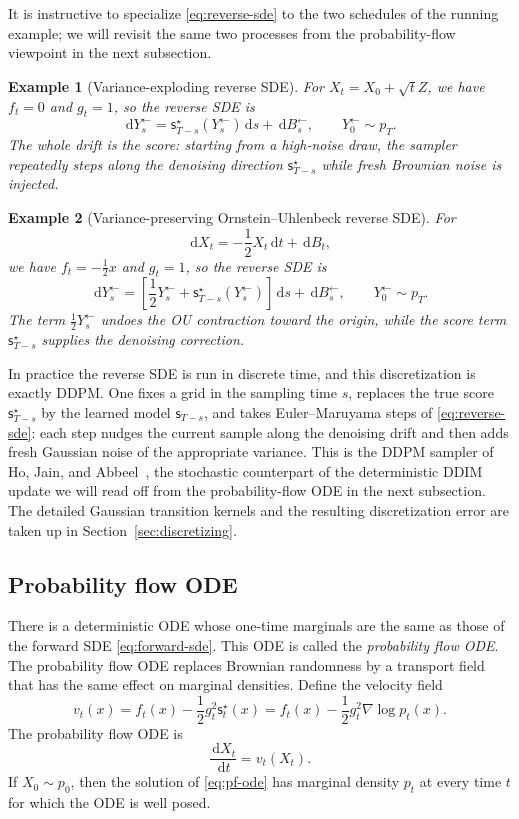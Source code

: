 \documentclass[10pt,a4paper]{amsart}
\numberwithin{equation}{section}
\newtheorem*{example}{Example}
\newcommand{\dd}{\,\mathrm{d}}
\newcommand{\sstar}{\mathsf{s}^{\star}}
\newcommand{\score}{\mathsf{s}}
\begin{document}
It is instructive to specialize \eqref{eq:reverse-sde} to the two schedules of
the running example; we will revisit the same two processes from the
probability-flow viewpoint in the next subsection.

\begin{example}[Variance-exploding reverse SDE]
For $X_t=X_0+\sqrt t Z$, we have $f_t=0$ and $g_t=1$, so the reverse SDE is
\[
    \dd Y^{\leftarrow}_s=\sstar_{T-s}(Y^{\leftarrow}_s)\dd s+\dd B^{\leftarrow}_s,
    \qquad Y^{\leftarrow}_0\sim p_T.
\]
The whole drift is the score: starting from a high-noise draw, the sampler
repeatedly steps along the denoising direction $\sstar_{T-s}$ while fresh
Brownian noise is injected.
\end{example}

\begin{example}[Variance-preserving Ornstein--Uhlenbeck reverse SDE]
For
\[
    \dd X_t=-\frac12X_t\dd t+\dd B_t,
\]
we have $f_t=-\frac12x$ and $g_t=1$, so the reverse SDE is
\[
    \dd Y^{\leftarrow}_s=\left[\frac12 Y^{\leftarrow}_s+\sstar_{T-s}(Y^{\leftarrow}_s)\right]\dd s+\dd B^{\leftarrow}_s,
    \qquad Y^{\leftarrow}_0\sim p_T.
\]
The term $\frac12 Y^{\leftarrow}_s$ undoes the OU contraction toward the origin, while the
score term $\sstar_{T-s}$ supplies the denoising correction.
\end{example}

In practice the reverse SDE is run in discrete time, and this discretization is
exactly DDPM\@.  One fixes a grid in the sampling time $s$, replaces the true
score $\sstar_{T-s}$ by the learned model $\score_{T-s}$, and takes
Euler--Maruyama steps of \eqref{eq:reverse-sde}: each step nudges the current
sample along the denoising drift and then adds fresh Gaussian noise of the
appropriate variance.  This is the DDPM sampler of Ho, Jain, and
Abbeel~\cite{ho2020ddpm}, the stochastic counterpart of the deterministic DDIM
update we will read off from the probability-flow ODE in the next subsection.
The detailed Gaussian transition kernels and the resulting discretization error
are taken up in Section~\ref{sec:discretizing}.

\subsection{Probability flow ODE}

There is a deterministic ODE whose one-time marginals are the same as those of
the forward SDE \eqref{eq:forward-sde}.  This ODE is called the
\emph{probability flow ODE}. The probability flow ODE replaces
Brownian randomness by a transport field that has the same effect on
marginal densities. Define the velocity field
\begin{equation}\label{eq:pf-velocity}
    v_t(x)
    =
    f_t(x)-\frac12 g_t^2\sstar_t(x)
    =
    f_t(x)-\frac12 g_t^2\nabla\log p_t(x).
\end{equation}
The probability flow ODE is
\begin{equation}\label{eq:pf-ode}
    \frac{\dd X_t}{\dd t}=v_t(X_t).
\end{equation}
If $X_0\sim p_0$, then the solution of \eqref{eq:pf-ode} has marginal density
$p_t$ at every time $t$ for which the ODE is well posed.
\end{document}
